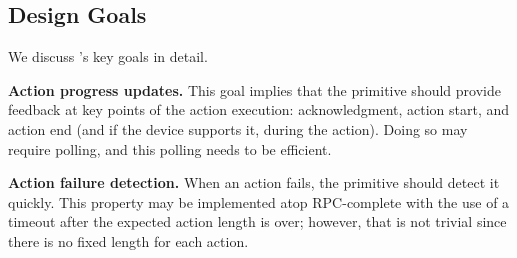 \subsection{Design Goals}
\label{rasc:sec:properties}

We discuss 's key goals in detail.

\noindent \textbf{Action progress updates.} 
This goal implies that
the primitive should provide feedback at key points of the action execution: acknowledgment, action start, and action end (and if the device supports it, during the action). Doing so may require polling, and this polling needs to be efficient. 


\noindent \textbf{Action failure detection.} When an action fails, the primitive should detect it quickly.
This property may be implemented atop RPC-complete with the use of a timeout after the expected action length is over; however, that is not trivial since there is no fixed length for each action.

